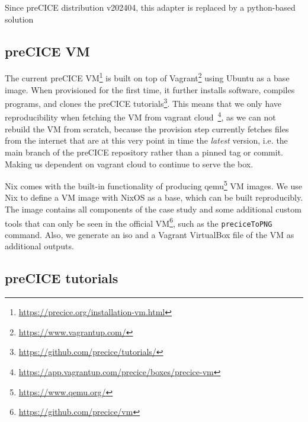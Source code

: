 \documentclass{eceasst}
\begin{document}
Since preCICE distribution v202404, this adapter is replaced by a python-based solution

\subsection{preCICE VM}

The current preCICE VM\footnote{\url{https://precice.org/installation-vm.html}} is built on top of Vagrant\footnote{\url{https://www.vagrantup.com/}} using Ubuntu as a base image.
When provisioned for the first time, it further installs software, compiles programs, and clones the preCICE tutorials\footnote{\url{https://github.com/precice/tutorials/}}.
This means that we only have reproducibility when fetching the VM from vagrant cloud~\footnote{\url{https://app.vagrantup.com/precice/boxes/precice-vm}}, as we can not rebuild the VM from scratch, because the provision step currently fetches files from the internet that are at this very point in time the \textit{latest} version, i.e. the main branch of the preCICE repository rather than a pinned tag or commit.
Making us dependent on vagrant cloud to continue to serve the box.

Nix comes with the built-in functionality of producing qemu\footnote{\url{https://www.qemu.org/}} VM images.
We use Nix to define a VM image with NixOS as a base, which can be built reproducibly.
The image contains all components of the case study and some additional custom tools that can only be seen in the official VM\footnote{\url{https://github.com/precice/vm}}, such as the \texttt{preciceToPNG} command.
Also, we generate an iso and a Vagrant VirtualBox file of the VM as additional outputs.

\subsection{preCICE tutorials}
\end{document}
